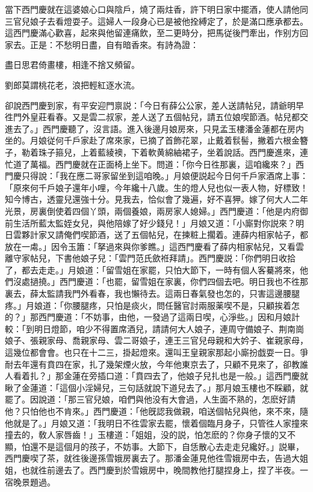 當下西門慶就在這婆娘心口與陰戶，燒了兩炷香，許下明日家中擺酒，使人請他同三官兒娘子去看燈耍子。這婦人一段身心已是被他拴縛定了，於是滿口應承都去。這西門慶滿心歡喜，起來與他留連痛飲，至二更時分，把馬従後門牽出，作别方回家去。正是：不愁明日盡，自有暗香來。有詩為證：

\begin{myquote}
盡日思君倚畫樓，相逢不捨又頻留。

劉郎莫謂桃花老，浪把輕紅逐水流。
\end{myquote}

卻說西門慶到家，有平安迎門禀説：「今日有薛公公家，差人送請帖兒，請爺明早徃門外皇莊看春。又是雲二叔家，差人送了五個帖兒，請五位娘喫節酒。帖兒都交進去了。」西門慶聽了，沒言語。進入後邊月娘房來，只見孟玉樓潘金蓮都在房内坐的。月娘従何千戶家赴了席來家，已摘了首飾花翠，止戴着䯼髻，撇着六根金簪子，勒着珠子箍兒，上着藍綾襖，下着軟黄綿紬裙子，坐着說話。西門慶進來，連忙道了萬福。西門慶就在正面椅上坐下。問道：「你今日徃那裏，這咱纔來？」西門慶只得說：「我在應二哥家留坐到這咱晚。」月娘便説起今日何千戶家酒席上事：「原來何千戶娘子還年小哩，今年纔十八歲。生的燈人兒也似一表人物，好標致！知今博古，透靈兒還強十分。見我去，恰似會了幾遍，好不喜狎。嫁了何大人二年光景，房裏倒使着四個丫頭，兩個養娘，兩房家人媳婦。」西門慶道：「他是内府御前生活所藍太監姪女兒，與他陪嫁了好少錢兒！」月娘又道：「小廝對你説來？明日雲夥計家又請俺們喫節酒，送了五個帖兒，在揀粧上擱着。連薛内相家帖子，都放在一䖏。」因令玉簫：「拏過來與你爹瞧。」這西門慶看了薛内相家帖兒，又看雲離守家帖兒，下書他娘子兒：「雲門范氏歛袵拜請」。西門慶説：「你們明日收拾了，都去走走。」月娘道：「留雪姐在家罷，只怕大節下，一時有個人客驀將來，他們沒處撾撓。」西門慶道：「也罷，留雪姐在家裏，你們四個去吧。明日我也不徃那裏去，薛太監請我門外看春，我也懶待去。這兩日春氣發也怎的，只害這邊腰腿疼。」月娘道：「你腰腿疼，只怕是痰火，問任醫官討兩服薬喫不是，只顧挨着怎的？」那西門慶道：「不妨事，由他，一發過了這兩日喫，心淨些。」因和月娘計較：「到明日燈節，咱少不得置席酒兒，請請何大人娘子，連周守備娘子、荆南崗娘子、張親家母、喬親家母、雲二哥娘子，連王三官兒母親和大妗子、崔親家母，這幾位都會會。也只在十二三，掛起燈來。還叫王皇親家那起小廝扮戯耍一日。爭耐去年還有賁四在家，扎了幾架煙火放，今年他東京去了，只顧不見來了，卻教誰人看着扎？」那金蓮在旁插口道：「賁四去了，他娘子兒扎也是一般。」這西門慶就瞅了金蓮道：「這個小淫婦兒，三句話就說下道兒去了。」那月娘玉樓也不睬顧，就罷了。因說道：「那三官兒娘，咱們與他没有大會過，人生面不熟的，怎麽好請他？只怕他也不肯來。」西門慶道：「他旣認我做親，咱送個帖兒與他，來不來，隨他就是了。」月娘又道：「我明日不徃雲家去罷，懷着個臨月身子，只管徃人家撞來撞去的，敎人家唇齒！」玉樓道：「姐姐，没的説，怕怎麽的？你身子懷的又不顯，怕還不是這個月的孩子，不妨事。大節下，自恁散心去走走兒纔好。」説畢，西門慶喫了茶，就徃後邊孫雪娥房裏去了。那潘金蓮見他徃雪娥房中去，告過大姐姐，也就徃前邊去了。西門慶到於雪娥房中，晚間教他打腿捏身上，捏了半夜。一宿晚景題過。

